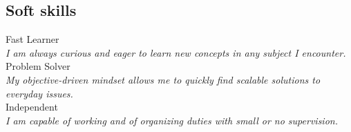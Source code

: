 \documentclass[letterpaper]{soragna-onepage-twocols} %
\begin{document}
\begin{minipage}[t]{0.3\textwidth}
\subsection{Soft skills}

Fast Learner\\
\emph{I am always curious and eager to learn new concepts in any subject I encounter.}\\
Problem Solver\\
\emph{My objective-driven mindset allows me to quickly find scalable solutions to everyday issues.}\\
Independent\\
\emph{I am capable of working and of organizing duties with small or no supervision.}\\



\end{minipage} %
\hfill
%
%
%
%
\end{document}
